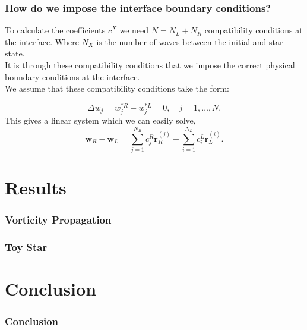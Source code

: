 \documentclass{beamer}
\begin{document}
\begin{frame}
\frametitle{How do we impose the interface boundary conditions?}
To calculate the coefficients $c^X$ we need  $N = N_L + N_R$ compatibility conditions at the interface. Where $N_X$ is the number of waves between the initial and star state.\\
It is through these compatibility conditions that we impose the correct physical boundary conditions at the interface.\\
We assume that these compatibility conditions take the form:

\begin{equation}
\Delta w_j = w^{*R}_j-w^{*L}_j = 0, \quad j = 1,\dots, N.
\end{equation}
This gives a linear system which we can easily solve,
\begin{equation}
\mathbf{w}_R - \mathbf{w}_L = \sum^{N_R}_{j=1}c^R_{j}\mathbf{r}^{(j)}_R +  \sum^{N_L}_{i=1}c^L_{i}\mathbf{r}^{(i)}_L.
\end{equation}
\end{frame}

\section{Results}
\begin{frame}
\frametitle{Vorticity Propagation}
\end{frame}
\begin{frame}
\frametitle{Toy Star}
\end{frame}
\section{Conclusion}
\begin{frame}
\frametitle{Conclusion}
\end{frame}
\end{document}

